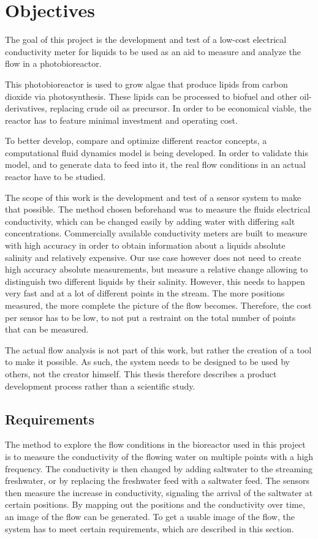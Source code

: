 \chapter{Objectives}

The goal of this project is the development and test of a low-cost electrical conductivity meter for liquids to be used as an aid to measure and analyze the flow in a photobioreactor.

This photobioreactor is used to grow algae that produce lipids from carbon dioxide via photosynthesis. These lipids can be processed to biofuel and other oil-derivatives, replacing crude oil as precursor. In order to be economical viable, the reactor has to feature minimal investment and operating cost.

To better develop, compare and optimize different reactor concepts, a computational fluid dynamics model is being developed. In order to validate this model, and to generate data to feed into it, the real flow conditions in an actual reactor have to be studied.

The scope of this work is the development and test of a sensor system to make that possible. The method chosen beforehand was to measure the fluids electrical conductivity, which can be changed easily by adding water with differing salt concentrations. Commercially available conductivity meters are built to measure with high accuracy in order to obtain information about a liquids absolute salinity and relatively expensive. Our use case however does not need to create high accuracy absolute measurements, but measure a relative change allowing to distinguish two different liquids by their salinity. However, this needs to happen very fast and at a lot of different points in the stream. The more positions measured, the more complete the picture of the flow becomes. Therefore, the cost per sensor has to be low, to not put a restraint on the total number of points that can be measured.

The actual flow analysis is not part of this work, but rather the creation of a tool to make it possible. As such, the system needs to be designed to be used by others, not the creator himself. This thesis therefore describes a product development process rather than a scientific study.

\section{Requirements}

The method to explore the flow conditions in the bioreactor used in this project is to measure the conductivity of the flowing water on multiple points with a high frequency. The conductivity is then changed by adding saltwater to the streaming freshwater, or by replacing the freshwater feed with a saltwater feed. The sensors then measure the increase in conductivity, signaling the arrival of the saltwater at certain positions. By mapping out the positions and the conductivity over time, an image of the flow can be generated. To get a usable image of the flow, the system has to meet certain requirements, which are described in this section.

